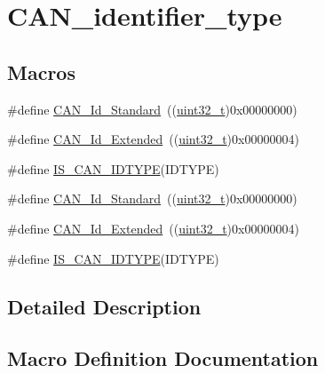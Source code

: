 \hypertarget{group___c_a_n__identifier__type}{}\section{C\+A\+N\+\_\+identifier\+\_\+type}
\label{group___c_a_n__identifier__type}
\subsection*{Macros}
\begin{DoxyCompactItemize}
\item 
\#define \hyperlink{group___c_a_n__identifier__type_ga151d9df8a6f361d0a3231593726b5a13}{C\+A\+N\+\_\+\+Id\+\_\+\+Standard}~((\hyperlink{_p_e___types_8h_a33594304e786b158f3fb30289278f5af}{uint32\+\_\+t})0x00000000)
\item 
\#define \hyperlink{group___c_a_n__identifier__type_gaf6c5c0b43b968fed17fd90246912b1a7}{C\+A\+N\+\_\+\+Id\+\_\+\+Extended}~((\hyperlink{_p_e___types_8h_a33594304e786b158f3fb30289278f5af}{uint32\+\_\+t})0x00000004)
\item 
\#define \hyperlink{group___c_a_n__identifier__type_gab845f7fbcf6ff8cf3d025210eb8900e4}{I\+S\+\_\+\+C\+A\+N\+\_\+\+I\+D\+T\+Y\+PE}(I\+D\+T\+Y\+PE)
\item 
\#define \hyperlink{group___c_a_n__identifier__type_ga151d9df8a6f361d0a3231593726b5a13}{C\+A\+N\+\_\+\+Id\+\_\+\+Standard}~((\hyperlink{_p_e___types_8h_a33594304e786b158f3fb30289278f5af}{uint32\+\_\+t})0x00000000)
\item 
\#define \hyperlink{group___c_a_n__identifier__type_gaf6c5c0b43b968fed17fd90246912b1a7}{C\+A\+N\+\_\+\+Id\+\_\+\+Extended}~((\hyperlink{_p_e___types_8h_a33594304e786b158f3fb30289278f5af}{uint32\+\_\+t})0x00000004)
\item 
\#define \hyperlink{group___c_a_n__identifier__type_gab845f7fbcf6ff8cf3d025210eb8900e4}{I\+S\+\_\+\+C\+A\+N\+\_\+\+I\+D\+T\+Y\+PE}(I\+D\+T\+Y\+PE)
\end{DoxyCompactItemize}


\subsection{Detailed Description}


\subsection{Macro Definition Documentation}
